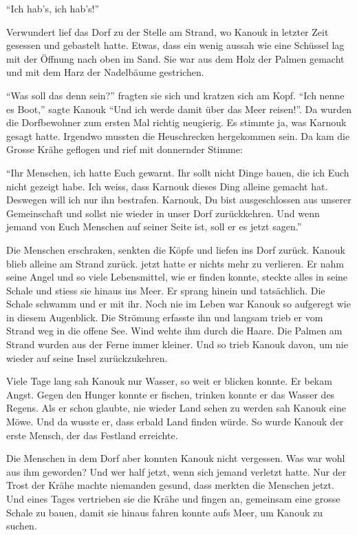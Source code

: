 \enquote{Ich hab's, ich hab's!}

Verwundert lief das Dorf zu der Stelle am Strand, wo Kanouk in letzter Zeit gesessen und gebastelt hatte. Etwas, dass ein wenig aussah wie eine Schüssel lag mit der Öffnung nach oben im Sand. Sie war aus dem Holz der Palmen gemacht und mit dem Harz der Nadelbäume gestrichen. 

\enquote{Was soll das denn sein?} fragten sie sich und kratzen sich am Kopf. \enquote{Ich nenne es Boot,} sagte Kanouk \enquote{Und ich werde damit über das Meer reisen!}. Da wurden die Dorfbewohner zum ersten Mal richtig neugierig. Es stimmte ja, was Karnouk gesagt hatte. Irgendwo mussten die Heuschrecken hergekommen sein. Da kam die Grosse Krähe geflogen und rief mit donnernder Stimme:

\enquote{Ihr Menschen, ich hatte Euch gewarnt. Ihr sollt nicht Dinge bauen, die ich Euch nicht gezeigt habe. Ich weiss, dass Karnouk dieses Ding alleine gemacht hat. Deswegen will ich nur ihn bestrafen. Karnouk, Du bist ausgeschlossen aus unserer Gemeinschaft und sollst nie wieder in unser Dorf zurückkehren. Und wenn jemand von Euch Menschen auf seiner Seite ist, soll er es jetzt sagen.}

Die Menschen erschraken, senkten die Köpfe und liefen ins Dorf zurück. Kanouk blieb alleine am Strand zurück. jetzt hatte er nichts mehr zu verlieren. Er nahm seine Angel und so viele Lebensmittel, wie er finden konnte, steckte alles in seine Schale und stiess sie hinaus ins Meer. Er sprang hinein und tatsächlich. Die Schale schwamm und er mit ihr. Noch nie im Leben war Kanouk so aufgeregt wie in diesem Augenblick. Die Strömung erfasste ihn und langsam trieb er vom Strand weg in die offene See. Wind wehte ihm durch die Haare. Die Palmen am Strand wurden aus der Ferne immer kleiner. Und so trieb Kanouk davon, um nie wieder auf seine Insel zurückzukehren.

Viele Tage lang sah Kanouk nur Wasser, so weit er blicken konnte. Er bekam Angst. Gegen den Hunger konnte er fischen, trinken konnte er das Wasser des Regens. Als er schon glaubte, nie wieder Land sehen zu werden sah Kanouk eine Möwe. Und da wusste er, dass erbald Land finden würde. So wurde Kanouk der erste Mensch, der das Festland erreichte.

Die Menschen in dem Dorf aber konnten Kanouk nicht vergessen. Was war wohl aus ihm geworden? Und wer half jetzt, wenn sich jemand verletzt hatte. Nur der Trost der Krähe machte niemanden gesund, dass merkten die Menschen jetzt. Und eines Tages vertrieben sie die Krähe und fingen an, gemeinsam eine grosse Schale zu bauen, damit sie hinaus fahren konnte aufs Meer, um Kanouk zu suchen.
